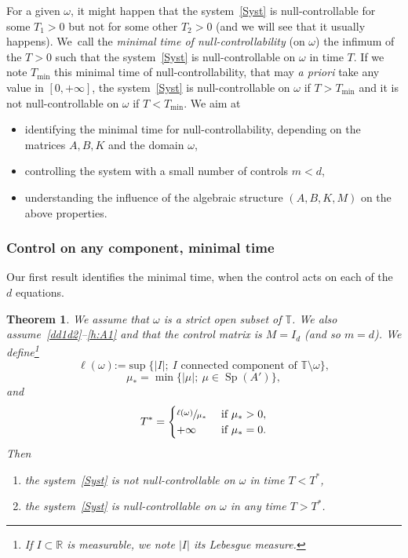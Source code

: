 \documentclass[10pt]{amsart}
\theoremstyle{plain}
\newtheorem{theorem}{Theorem}
\theoremstyle{definition}
\theoremstyle{remark}
\DeclareMathOperator{\Sp}{Sp}
\newcommand{\set}{\mathbb}
\newcommand{\T}{\set{T}}
\newcommand{\coloneqq}{\mathrel{\mathord{:}\mathord=}}
\begin{document}
For a given $\omega$, it might happen that the system~\eqref{Syst} is null-controllable for some $T_1>0$ but not for some other $T_2>0$ (and we will see that it usually happens). We~call the \emph{minimal time of null-controllability} (on $\omega$) the infimum of the $T>0$ such that the system~\eqref{Syst} is null-controllable on $\omega$ in time $T$. If we note $T_{\mathrm{min}}$ this minimal time of null-controllability, that may \emph{a priori} take any value in $[0,+\infty]$, the system~\eqref{Syst} is null-controllable on $\omega$ if $T>T_{\mathrm{min}}$ and it is not null-controllable on $\omega$ if $T<T_{\mathrm{min}}$. We aim at
\begin{itemize}
\item identifying the minimal time for null-controllability, depending on the matrices $A,B,K$ and the domain $\omega$,
\item controlling the system with a small number of controls $m<d$,
\item understanding the influence of the algebraic structure $(A,B,K,M)$ on the above properties.
\end{itemize}


\subsubsection{Control on any component, minimal time}

Our first result identifies the minimal time, when the control acts on each of the $d$ equations.

\begin{theorem}\label{th:main}
We assume that $\omega$ is a strict open subset of $\set T$. We also assume~\eqref{dd1d2}--\eqref{h:A1} and that the control matrix is $M=I_d$ (and so $m=d$).
We define\footnote{If $I\subset \set R$ is measurable, we note $|I|$ its Lebesgue measure.}
\begin{equation}\label{eq:def_l}\ell(\omega) \coloneqq \sup\{ |I|;\ I \text{ connected component of } \T \setminus \omega \},\end{equation}
\[
\mu_*=\min\{ |\mu|;\ \mu \in \Sp(A') \},
\]
and
\begin{equation}\label{eq:T}
T^\ast =
\begin{cases}
\sfrac{\ell(\omega)}{\mu_*} & \text{ if } \mu_* >0, \\
+\infty & \text{ if } \mu_*=0.
\end{cases}
\end{equation}
Then
\begin{enumerate}
\item
\label{th:maini} the system~\eqref{Syst} is not null-controllable on $\omega$ in time $T<T^\ast$,
\item\label{th:mainii} the system~\eqref{Syst} is null-controllable on $\omega$ in any time $T>T^\ast$.
\end{enumerate}
\end{theorem}
\end{document}

